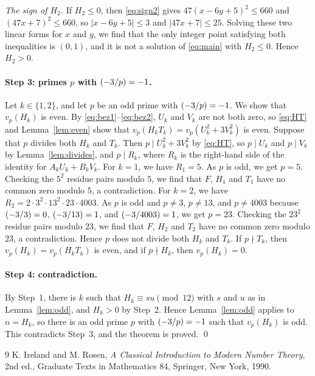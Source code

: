 \documentclass[11pt]{article}
\newcommand{\leg}[2]{\mathchoice{\biggl(\dfrac{#1}{#2}\biggr)}{(#1/#2)}{(#1/#2)}{(#1/#2)}}
\begin{document}
\emph{The sign of $H_{2}$.} If $H_{2}\leq0$, then \eqref{eq:sign2} gives $47(x-6y+5)^2\leq 660$ and $(47x+7)^2\leq 660$, so $|x-6y+5|\leq3$ and $|47x+7|\leq25$. Solving these two linear forms for $x$ and $y$, we find that the only integer point satisfying both inequalities is $(0,1)$, and it is not a solution of \eqref{eq:main} with $H_{2}\leq0$. Hence $H_{2}>0$.

\paragraph{Step 3: primes $p$ with $\leg{-3}{p}=-1$.} Let $k\in\{1,2\}$, and let $p$ be an odd prime with $\leg{-3}{p}=-1$. We show that $v_p(H_k)$ is even. By \eqref{eq:bez1}--\eqref{eq:bez2}, $U_k$ and $V_k$ are not both zero, so \eqref{eq:HT} and Lemma~\ref{lem:even} show that $v_p(H_kT_k)=v_p(U_k^2+3V_k^2)$ is even. Suppose that $p$ divides both $H_k$ and $T_k$. Then $p\mid U_k^2+3V_k^2$ by \eqref{eq:HT}, so $p\mid U_k$ and $p\mid V_k$ by Lemma~\ref{lem:divides}, and $p\mid R_k$, where $R_k$ is the right-hand side of the identity for $A_kU_k+B_kV_k$. For $k=1$, we have $R_{1}=5$. As $p$ is odd, we get $p=5$. Checking the $5^2$ residue pairs modulo $5$, we find that $F$, $H_{1}$ and $T_{1}$ have no common zero modulo $5$, a contradiction. For $k=2$, we have $R_{2}=2\cdot 3^{2}\cdot 13^{2}\cdot 23\cdot 4003$. As $p$ is odd and $p\neq3$, $p\neq13$, and $p\neq4003$ because $\leg{-3}{3}=0$, $\leg{-3}{13}=1$, and $\leg{-3}{4003}=1$, we get $p=23$. Checking the $23^2$ residue pairs modulo $23$, we find that $F$, $H_{2}$ and $T_{2}$ have no common zero modulo $23$, a contradiction. Hence $p$ does not divide both $H_k$ and $T_k$. If $p\nmid T_k$, then $v_p(H_k)=v_p(H_kT_k)$ is even, and if $p\nmid H_k$, then $v_p(H_k)=0$.

\paragraph{Step 4: contradiction.} By Step~1, there is $k$ such that $H_k\equiv su\pmod{12}$ with $s$ and $u$ as in Lemma~\ref{lem:odd}, and $H_k>0$ by Step~2. Hence Lemma~\ref{lem:odd} applies to $n=H_k$, so there is an odd prime $p$ with $\leg{-3}{p}=-1$ such that $v_p(H_k)$ is odd. This contradicts Step~3, and the theorem is proved.
\qed

\begin{thebibliography}{9}
 K. Ireland and M. Rosen, \emph{A Classical Introduction to Modern Number Theory}, 2nd ed., Graduate Texts in Mathematics 84, Springer, New York, 1990.
\end{thebibliography}
\end{document}

